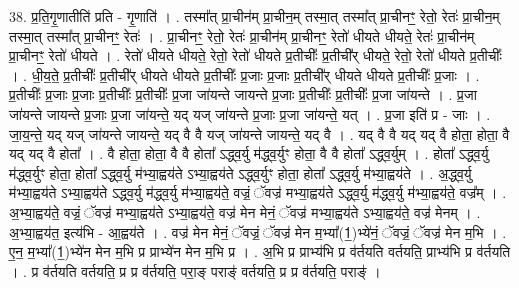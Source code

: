 \documentclass[17pt]{extarticle}
\begin{document}
38. प्र॒ति॒गृ॒णातीति॑ प्रति - गृ॒णाति॑ । . तस्मा᳚त् प्रा॒चीन॑म् प्रा॒चीन॒म् तस्मा॒त् तस्मा᳚त् प्रा॒चीनꣳ॒॒ रेतो॒ रेतः॑ प्रा॒चीन॒म् तस्मा॒त् तस्मा᳚त् प्रा॒चीनꣳ॒॒ रेतः॑ । . प्रा॒चीनꣳ॒॒ रेतो॒ रेतः॑ प्रा॒चीन॑म् प्रा॒चीनꣳ॒॒ रेतो॑ धीयते धीयते॒ रेतः॑ प्रा॒चीन॑म् प्रा॒चीनꣳ॒॒ रेतो॑ धीयते । . रेतो॑ धीयते धीयते॒ रेतो॒ रेतो॑ धीयते प्र॒तीचीः᳚ प्र॒तीची᳚र् धीयते॒ रेतो॒ रेतो॑ धीयते प्र॒तीचीः᳚ । . धी॒य॒ते॒ प्र॒तीचीः᳚ प्र॒तीची᳚र् धीयते धीयते प्र॒तीचीः᳚ प्र॒जाः प्र॒जाः प्र॒तीची᳚र् धीयते धीयते प्र॒तीचीः᳚ प्र॒जाः । . प्र॒तीचीः᳚ प्र॒जाः प्र॒जाः प्र॒तीचीः᳚ प्र॒तीचीः᳚ प्र॒जा जा॑यन्ते जायन्ते प्र॒जाः प्र॒तीचीः᳚ प्र॒तीचीः᳚ प्र॒जा जा॑यन्ते । . प्र॒जा जा॑यन्ते जायन्ते प्र॒जाः प्र॒जा जा॑यन्ते॒ यद् यज् जा॑यन्ते प्र॒जाः प्र॒जा जा॑यन्ते॒ यत् । . प्र॒जा इति॑ प्र - जाः । . जा॒य॒न्ते॒ यद् यज् जा॑यन्ते जायन्ते॒ यद् वै वै यज् जा॑यन्ते जायन्ते॒ यद् वै । . यद् वै वै यद् यद् वै होता॒ होता॒ वै यद् यद् वै होता᳚ । . वै होता॒ होता॒ वै वै होता᳚ ऽद्ध्व॒र्यु म॑द्ध्व॒र्युꣳ होता॒ वै वै होता᳚ ऽद्ध्व॒र्युम् । . होता᳚ ऽद्ध्व॒र्यु म॑द्ध्व॒र्युꣳ होता॒ होता᳚ ऽद्ध्व॒र्यु म॑भ्या॒ह्वय॑ते ऽभ्या॒ह्वय॑ते ऽद्ध्व॒र्युꣳ होता॒ होता᳚ ऽद्ध्व॒र्यु म॑भ्या॒ह्वय॑ते । . अ॒द्ध्व॒र्यु म॑भ्या॒ह्वय॑ते ऽभ्या॒ह्वय॑ते ऽद्ध्व॒र्यु म॑द्ध्व॒र्यु म॑भ्या॒ह्वय॑ते॒ वज्रं॒ ॅवज्र॑ मभ्या॒ह्वय॑ते ऽद्ध्व॒र्यु म॑द्ध्व॒र्यु म॑भ्या॒ह्वय॑ते॒ वज्र᳚म् । . अ॒भ्या॒ह्वय॑ते॒ वज्रं॒ ॅवज्र॑ मभ्या॒ह्वय॑ते ऽभ्या॒ह्वय॑ते॒ वज्र॑ मेन मेनं॒ ॅवज्र॑ मभ्या॒ह्वय॑ते ऽभ्या॒ह्वय॑ते॒ वज्र॑ मेनम् । . अ॒भ्या॒ह्वय॑त॒ इत्य॑भि - आ॒ह्वय॑ते । . वज्र॑ मेन मेनं॒ ॅवज्रं॒ ॅवज्र॑ मेन म॒भ्या᳚(1॒)भ्ये॑नं॒ ॅवज्रं॒ ॅवज्र॑ मेन म॒भि । . ए॒न॒ म॒भ्या᳚(1॒)भ्ये॑न मेन म॒भि प्र प्राभ्ये॑न मेन म॒भि प्र । . अ॒भि प्र प्राभ्य॑भि प्र व॑र्तयति वर्तयति॒ प्राभ्य॑भि प्र व॑र्तयति । . प्र व॑र्तयति वर्तयति॒ प्र प्र व॑र्तयति॒ परा॒ङ् पराङ्॑ वर्तयति॒ प्र प्र व॑र्तयति॒ पराङ्॑ । \newline
\end{document}
